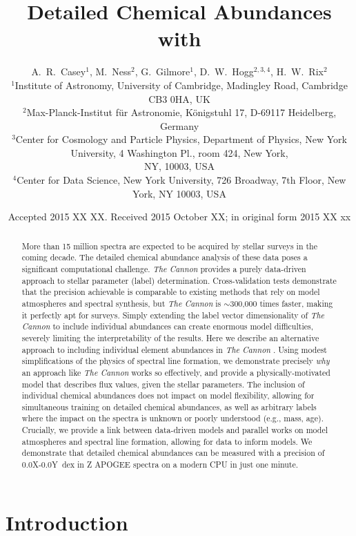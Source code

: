 \documentclass[useAMS,usenatbib]{mn2e}
\title[Cannon Chemistry]{Detailed Chemical Abundances with \tc}
\author[Casey et al.]{A.~R.~Casey$^1$, M.~Ness$^2$, G.~Gilmore$^1$,
    D.~W.~Hogg$^{2,3,4}$, H.~W.~Rix$^2$ \\ 
$^1$Institute of Astronomy, University of Cambridge, Madingley Road, Cambridge
    CB3 0HA, UK\\
$^2$Max-Planck-Institut f\"ur Astronomie, K\"onigstuhl 17, D-69117 Heidelberg,
    Germany\\
$^3$Center for Cosmology and Particle Physics, Department of Physics, New York
    University, 4 Washington Pl., room 424, New York, \\
    NY, 10003, USA\\
$^4$Center for Data Science, New York University, 726 Broadway, 7th Floor,
    New York, NY 10003, USA}
\newcommand\tc{\textit{The Cannon} }
\begin{document}
\date{Accepted 2015 XX XX. Received 2015 October XX; in original form 2015 XX xx}

\pagerange{\pageref{firstpage}--\pageref{lastpage}} 

\maketitle

\label{firstpage}

\begin{abstract}
More than 15 million spectra are expected to be acquired by stellar surveys in
the coming decade. The detailed chemical abundance analysis of these data poses
a significant computational challenge. \tc provides a purely data-driven
approach to stellar parameter (label) determination. Cross-validation tests
demonstrate that the precision achievable is comparable to existing methods that
rely on model atmospheres and spectral synthesis, but \tc is $\sim$300,000 times
faster, making it perfectly apt for surveys. Simply extending the label vector
dimensionality of \tc to include individual abundances can create enormous
model difficulties, severely limiting the interpretability of the results. Here
we describe an alternative approach to including individual element abundances
in \tc. Using modest simplifications of the physics of spectral line formation,
we demonstrate precisely \textit{why} an approach like \tc works so effectively,
and provide a physically-motivated model that describes flux values, given the
stellar parameters. The inclusion of individual chemical abundances does not
impact on model flexibility, allowing for simultaneous training on detailed
chemical abundances, as well as arbitrary labels where the impact on the spectra
is unknown or poorly understood (e.g., mass, age). Crucially, we provide a link
between data-driven models and parallel works on model atmospheres and spectral
line formation, allowing for data to inform models. We demonstrate that
detailed chemical abundances can be measured with a precision of 0.0X-0.0Y~dex
in Z APOGEE spectra on a modern CPU in just one minute.
\end{abstract}

\begin{keywords}
\end{keywords}

\section{Introduction}
\end{document}
